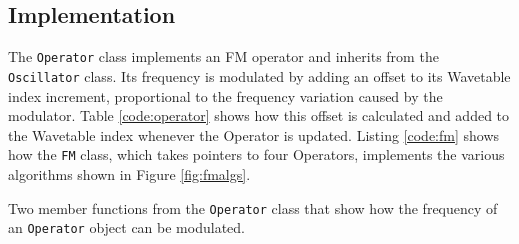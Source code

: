   \subsection{Implementation}

  The \texttt{Operator} class implements an FM operator and inherits from the \texttt{Oscillator} class. Its frequency is modulated by adding an offset to its Wavetable index increment, proportional to the frequency variation caused by the modulator. Table \ref{code:operator} shows how this offset is calculated and added to the Wavetable index whenever the Operator is updated. Listing \ref{code:fm} shows how the \texttt{FM} class, which takes pointers to four Operators, implements the various algorithms shown in Figure \ref{fig:fmalgs}.

  \begin{table}[hb!]
    \caption{Two member functions from the \texttt{Operator} class that show how the frequency of an \texttt{Operator} object can be modulated.}
    \label{code:operator}
  \end{table}
